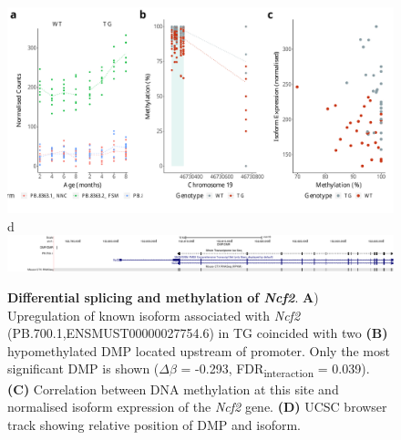 \begin{figure}[h]
	\includegraphics[page=3,scale = 0.4]{Figures/WholeDifferentialAnalysis_DMPDMR.pdf}
	\\
	\hspace*{0.2cm}\vspace{0.5cm}\large d
	\\
	\includegraphics[page=1,trim={1.5cm 0 0 0},scale = 0.9]{Figures/NCF2_DMP.pdf}
	\captionsetup{width=0.95\textwidth}
	\caption[Differential splicing and methylation of \textit{Ncf2}]%
	{\textbf{Differential splicing and methylation of \textit{Ncf2}}. \textbf{A}) Upregulation of known isoform associated with \textit{Ncf2} (PB.700.1,ENSMUST00000027754.6) in TG coincided with two \textbf{(B)} hypomethylated DMP located upstream of promoter. Only the most significant DMP is shown ($\Delta$$\beta$ = -0.293, FDR\textsubscript{interaction} = 0.039). \textbf{(C)} Correlation between DNA methylation at this site and normalised isoform expression of the \textit{Ncf2} gene. \textbf{(D)} UCSC browser track showing relative position of DMP and isoform.}    
	\label{fig:IntMeth_Ncf2}
\end{figure}

